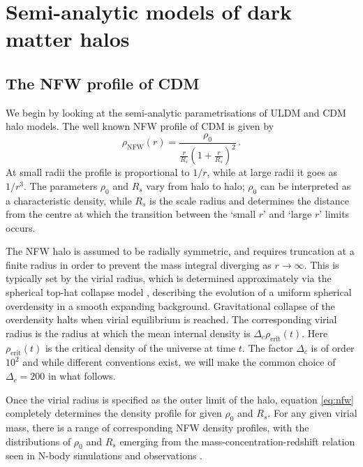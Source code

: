 \documentclass{pasa}%
\begin{document}
 
\section{Semi-analytic models of dark matter halos}\label{sec:models}


\subsection{The NFW profile of CDM}\label{sec:NFW}

We begin by looking at the semi-analytic parametrisations of ULDM and CDM halo models. The  well known  NFW   profile of CDM \cite{Navarro:1995iw, Maccio:2008pcd}  is given by
%
\begin{equation}\label{eq:nfw}
    \rho_\mathrm{NFW}(r)=\frac{\rho_0}{\frac{r}{R_s}\left(1+\frac{r}{R_s}\right)^2} \, .
\end{equation}
%
At small radii the profile is proportional to $1/r$, while at large radii it goes as $1/r^3$. The parameters $\rho_0$ and $R_s$ vary from halo to halo; $\rho_0$ can be interpreted as a characteristic density, while $R_s$ is the scale radius and determines the distance from the centre at which the transition between the `small $r$' and `large $r$' limits occurs. 

The NFW halo is assumed to be radially symmetric, and requires truncation at a finite radius in order to prevent the mass integral diverging as $r\rightarrow \infty$. This is typically set by the virial radius, which is  determined approximately via the spherical top-hat collapse model \cite{White:2000jv, Suto:2015jdt, Herrera:2017epn}, describing the evolution of a uniform spherical overdensity in a smooth expanding background. Gravitational collapse of the overdensity halts when virial equilibrium is reached. The corresponding virial radius is the radius at which the mean internal density is $\Delta_c \rho_\mathrm{crit}(t)$. Here $\rho_\mathrm{crit}(t)$ is the critical density of the universe at time $t$. The  factor $\Delta_c$ is of order $10^2$ and while different conventions exist, we will make the common choice of $\Delta_c = 200$ \cite{Richings:2018} in what follows. 

Once the virial radius is specified as the outer limit of the halo, equation \ref{eq:nfw} completely determines the density profile for given  $\rho_0$ and $R_s$. For any given virial mass, there is a range of corresponding NFW density profiles, with the distributions of $\rho_0$ and $R_s$ emerging from the mass-concentration-redshift relation seen in N-body simulations and observations \cite{Ludlow:2013vxa, Ragagnin:2018enf}. 
\end{document}
